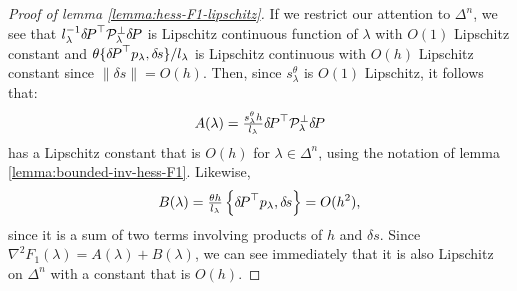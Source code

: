 \documentclass[smallcondensed]{svjour3}
\begin{document}
\begin{proof}[Proof of lemma \ref{lemma:hess-F1-lipschitz}]
  If we restrict our attention to $\Delta^n$, we see that
  $l_\lambda^{-1} {\delta \hspace{-0.14em} P}^\top \mathcal{P}_\lambda^\perp {\delta \hspace{-0.14em} P}$ is
  Lipschitz continuous function of $\lambda$ with $O(1)$ Lipschitz
  constant and $\theta \{{{\delta \hspace{-0.14em} P}}^\top p_\lambda, {\delta \hspace{-0.1em} s}\} /l_{\lambda}$
  is Lipschitz continuous with $O(h)$ Lipschitz constant since
  $\|\delta s\| = O(h)$. Then, since $s^\theta_\lambda$ is $O(1)$
  Lipschitz, it follows that:
  \begin{equation}
    A(\lambda) = \tfrac{s^\theta_\lambda h}{l_\lambda} {\delta \hspace{-0.14em} P}^\top
    \mathcal{P}^\perp_\lambda {\delta \hspace{-0.14em} P}
  \end{equation}
  has a Lipschitz constant that is $O(h)$ for $\lambda \in \Delta^n$,
  using the notation of lemma
  \ref{lemma:bounded-inv-hess-F1}. Likewise,
  \begin{equation}
    B(\lambda) = \tfrac{\theta h}{l_\lambda} \left\{{\delta \hspace{-0.14em} P}^\top
      p_\lambda, {\delta \hspace{-0.1em} s}\right\} = O(h^2),
  \end{equation}
  since it is a sum of two terms involving products of $h$ and
  $\delta s$. Since $\nabla^2 F_1(\lambda) = A(\lambda) + B(\lambda)$,
  we can see immediately that it is also Lipschitz on $\Delta^n$ with
  a constant that is $O(h)$.
\end{proof}
\end{document}
